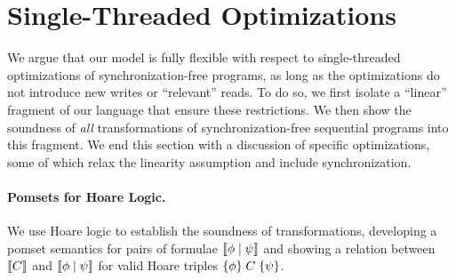 \clearpage
\section{Single-Threaded Optimizations}
\label{sec:opt}

We argue that our model is fully flexible with respect to single-threaded
optimizations of synchronization-free programs, as long as the
optimizations do not introduce new writes or ``relevant'' reads.  To do so, we
first isolate a ``linear'' fragment of our language that ensure these
restrictions.  We then show the soundness of {\em all} transformations of
synchronization-free sequential programs into this fragment.  
%
We end this section with a discussion of specific optimizations, some of
which relax the linearity assumption and include synchronization.

\paragraph{Pomsets for Hoare Logic.}
We use Hoare logic to establish the soundness of transformations, developing
a pomset semantics for pairs of formulae $\llbracket\phi\mid\psi\rrbracket$ and showing
a relation between $\llbracket C\rrbracket$ and $\llbracket\phi\mid\psi\rrbracket$ for valid Hoare
triples $\{\phi\}\allowbreak\;C\;\allowbreak\{\psi\}$.

